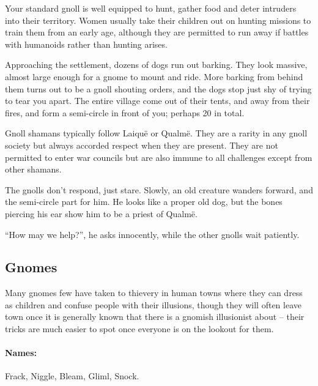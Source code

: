 \begin{multicols}{2}
Your standard gnoll is well equipped to hunt, gather food and deter intruders into their territory.
Women usually take their children out on hunting missions to train them from an early age, although they are permitted to run away if battles with humanoids rather than hunting arises.

\begin{boxtext}

  Approaching the settlement, dozens of dogs run out barking.
  They look massive, almost large enough for a gnome to mount and ride.
  More barking from behind them turns out to be a gnoll shouting orders, and the dogs stop just shy of trying to tear you apart.
  The entire village come out of their tents, and away from their fires, and form a semi-circle in front of you; perhaps 20 in total.

\end{boxtext}

\label{gnoll_shaman}

Gnoll shamans typically follow Laiqu\"{e} or Qualm\"{e}.  They are a rarity in any gnoll society but always accorded respect when they are present.  They are not permitted to enter war councils but are also immune to all challenges except from other shamans.


\begin{boxtext}

  The gnolls don't respond, just stare.  
  Slowly, an old creature wanders forward, and the semi-circle part for him.
  He looks like a proper old dog, but the bones piercing his ear show him to be a priest of Qualm\"{e}.

  ``How may we help?'', he asks innocently, while the other gnolls wait patiently.

\end{boxtext}

\subsection{Gnomes}

Many gnomes few have taken to thievery in human towns where they can dress as children and confuse people with their illusions, though they will often leave town once it is generally known that there is a gnomish illusionist about -- their tricks are much easier to spot once everyone is on the lookout for them.

\paragraph{Names:} Frack, Niggle, Bleam, Gliml, Snock.


\end{multicols}
